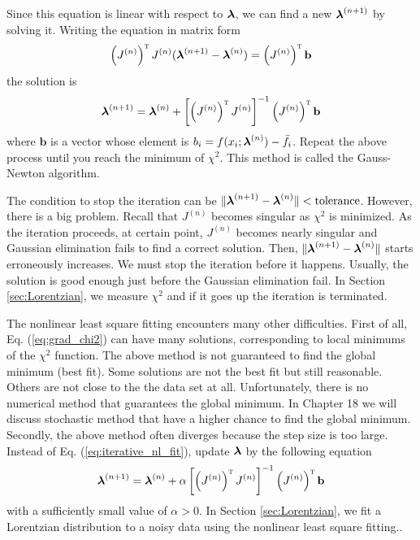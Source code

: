 Since this equation is linear with respect to $\boldsymbol{\lambda}$, we can find a new $\boldsymbol{\lambda}^{(n+1)}$ by solving it.  Writing the equation in matrix form
\begin{equation}
\left ( J^{(n)}\right )^\textsc{t} J^{(n)} (\boldsymbol{\lambda}^{(n+1)} - \boldsymbol{\lambda}^{(n)})  =\left ( J^{(n)}\right )^\textsc{t} \mathbf{b}
\end{equation}
the solution is
\begin{equation}\label{eq:iterative_nl_fit}
\boldsymbol{\lambda}^{(n+1)} = \boldsymbol{\lambda}^{(n)} + \left [ \left ( J^{(n)}\right )^\textsc{t} J^{(n)} \right ]^{-1} \left ( J^{(n)}\right )^\textsc{t} \mathbf{b}
\end{equation} 
where $\mathbf{b}$ is a vector whose element is $b_i=f(x_i;\boldsymbol{\lambda}^{(n)})-\bar{f}_i$.
Repeat the above process until you reach the minimum of $\chi^2$.   This method is called the Gauss-Newton algorithm.

 The condition to stop the iteration can be $\|\boldsymbol{\lambda}^{(n+1)} -
\boldsymbol{\lambda}^{(n)} \| < \text{tolerance}$.  However, there is a big problem.  Recall that $J^{(n)}$ becomes singular as $\chi^2$ is minimized. As the iteration proceeds, at certain point, $J^{(n)}$ becomes nearly singular and Gaussian elimination fails to find a correct solution.  Then, $\|\boldsymbol{\lambda}^{(n+1)} -
\boldsymbol{\lambda}^{(n)} \|$ starts erroneously increases.  We must stop the iteration before it happens. Usually, the solution is good enough just before the Gaussian elimination fail. In Section \ref{sec:Lorentzian}, we measure $\chi^2$ and if it goes up the iteration is terminated.   
 
The nonlinear least square fitting encounters many other difficulties.
First of all,  Eq. (\ref{eq:grad_chi2}) can have many solutions, corresponding to local minimums of the $\chi^2$ function.  The above method is not guaranteed to find the global minimum (best fit).  Some solutions are not the best fit but still reasonable.  Others are not close to the the data set at all.
Unfortunately, there is no numerical method that guarantees the global minimum.  In Chapter 18 we will discuss stochastic method that have a higher chance to find the global minimum.
Secondly, the above method often diverges because the step size is too large.  Instead of Eq. (\ref{eq:iterative_nl_fit}), update $\boldsymbol{\lambda}$ 
by the following equation
\begin{equation}
\boldsymbol{\lambda}^{(n+1)} = \boldsymbol{\lambda}^{(n)} + \alpha \left [ \left ( J^{(n)}\right )^\textsc{t} J^{(n)} \right ]^{-1} \left ( J^{(n)}\right )^\textsc{t} \mathbf{b}
\end{equation}
with a sufficiently small value of  $\alpha >0$.
In Section \ref{sec:Lorentzian}, we fit a Lorentzian distribution to a noisy data using the nonlinear least square fitting..



